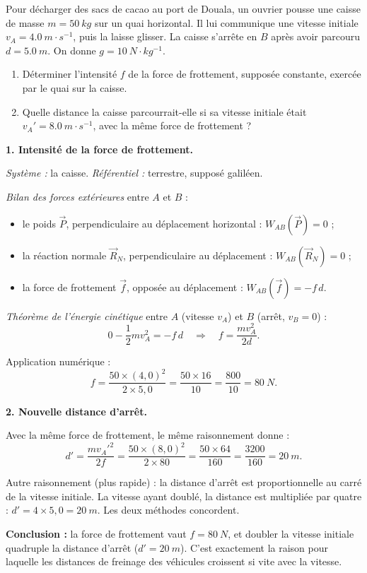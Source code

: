\documentclass[11pt]{article}
\begin{document}
\begin{exoresolu}
Pour décharger des sacs de cacao au port de Douala, un ouvrier pousse une caisse de masse $m = \SI{50}{kg}$ sur un quai horizontal. Il lui communique une vitesse initiale $v_A = \SI{4,0}{m\cdot s^{-1}}$, puis la laisse glisser. La caisse s'arrête en $B$ après avoir parcouru $d = \SI{5,0}{m}$. On donne $g = \SI{10}{N\cdot kg^{-1}}$.
\begin{enumerate}
\item Déterminer l'intensité $f$ de la force de frottement, supposée constante, exercée par le quai sur la caisse.
\item Quelle distance la caisse parcourrait-elle si sa vitesse initiale était $v_A' = \SI{8,0}{m\cdot s^{-1}}$, avec la même force de frottement ?
\end{enumerate}
\tcblower
\textbf{1. Intensité de la force de frottement.}

\textit{Système :} la caisse. \textit{Référentiel :} terrestre, supposé galiléen.

\textit{Bilan des forces extérieures} entre $A$ et $B$ :
\begin{itemize}
\item le poids $\vec{P}$, perpendiculaire au déplacement horizontal : $W_{AB}(\vec{P}) = 0$ ;
\item la réaction normale $\vec{R}_N$, perpendiculaire au déplacement : $W_{AB}(\vec{R}_N) = 0$ ;
\item la force de frottement $\vec{f}$, opposée au déplacement : $W_{AB}(\vec{f}) = -f\,d$.
\end{itemize}

\textit{Théorème de l'énergie cinétique} entre $A$ (vitesse $v_A$) et $B$ (arrêt, $v_B = 0$) :
\[ 0 - \frac{1}{2}mv_A^2 = -f\,d \quad\Longrightarrow\quad f = \frac{mv_A^2}{2d}. \]

Application numérique :
\[ f = \frac{50 \times (4,0)^2}{2 \times 5,0} = \frac{50 \times 16}{10} = \frac{800}{10} = \SI{80}{N}. \]

\textbf{2. Nouvelle distance d'arrêt.}

Avec la même force de frottement, le même raisonnement donne :
\[ d' = \frac{mv_A'^2}{2f} = \frac{50 \times (8,0)^2}{2 \times 80} = \frac{50 \times 64}{160} = \frac{3200}{160} = \SI{20}{m}. \]

Autre raisonnement (plus rapide) : la distance d'arrêt est proportionnelle au carré de la vitesse initiale. La vitesse ayant doublé, la distance est multipliée par quatre : $d' = 4\times 5,0 = \SI{20}{m}$. Les deux méthodes concordent.

\textbf{Conclusion :} la force de frottement vaut $f = \SI{80}{N}$, et doubler la vitesse initiale quadruple la distance d'arrêt ($d' = \SI{20}{m}$). C'est exactement la raison pour laquelle les distances de freinage des véhicules croissent si vite avec la vitesse.
\end{exoresolu}
\end{document}
